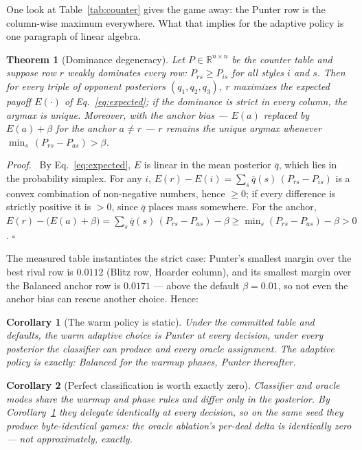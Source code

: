 \documentclass[11pt]{article}
\newtheorem{theorem}{Theorem}
\newtheorem{corollary}{Corollary}
\newenvironment{proofenv}{\noindent\textit{Proof.}\ }{\hfill$\square$\par\medskip}
\begin{document}
One look at Table~\ref{tab:counter} gives the game away: the Punter row is the
column-wise maximum everywhere. What that implies for the adaptive policy is one
paragraph of linear algebra.

\begin{theorem}[Dominance degeneracy]
\label{thm:dominance}
Let $P \in \mathbb{R}^{n \times n}$ be the counter table and suppose row $r$ weakly
dominates every row: $P_{rs} \ge P_{is}$ for all styles $i$ and $s$. Then for every triple
of opponent posteriors $(q_1, q_2, q_3)$, $r$ maximizes the expected payoff
$E(\cdot)$ of Eq.~\eqref{eq:expected}; if the dominance is strict in every column, the
argmax is unique. Moreover, with the anchor bias --- $E(a)$ replaced by $E(a) + \beta$ for
the anchor $a \ne r$ --- $r$ remains the unique argmax whenever
$\min_s\, (P_{rs} - P_{as}) > \beta$.
\end{theorem}

\begin{proofenv}
By Eq.~\eqref{eq:expected}, $E$ is linear in the mean posterior $\bar q$, which lies in
the probability simplex. For any $i$,
$E(r) - E(i) = \sum_s \bar q(s)\,(P_{rs} - P_{is})$ is a convex combination of
non-negative numbers, hence $\ge 0$; if every difference is strictly positive it is
$> 0$, since $\bar q$ places mass somewhere. For the anchor,
$E(r) - \big(E(a) + \beta\big) = \sum_s \bar q(s)\,(P_{rs} - P_{as}) - \beta
\ge \min_s (P_{rs} - P_{as}) - \beta > 0$.
\end{proofenv}

\noindent
The measured table instantiates the strict case: Punter's smallest margin over the best
rival row is $0.0112$ (Blitz row, Hoarder column), and its smallest margin over the
Balanced anchor row is $0.0171$ --- above the default $\beta = 0.01$, so not even the
anchor bias can rescue another choice. Hence:

\begin{corollary}[The warm policy is static]
\label{cor:static}
Under the committed table and defaults, the warm adaptive choice is Punter at every
decision, under every posterior the classifier can produce and every oracle assignment.
The adaptive policy is exactly: Balanced for the warmup phases, Punter thereafter.
\end{corollary}

\begin{corollary}[Perfect classification is worth exactly zero]
\label{cor:oracle}
Classifier and oracle modes share the warmup and phase rules and differ only in the
posterior. By Corollary~\ref{cor:static} they delegate identically at every decision, so
on the same seed they produce byte-identical games: the oracle ablation's per-deal delta
is identically zero --- not approximately, exactly.
\end{corollary}
\end{document}
